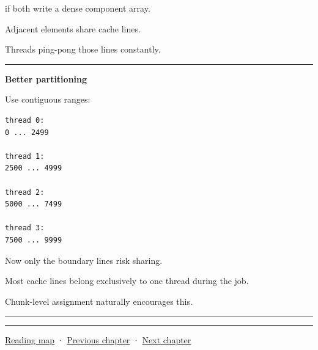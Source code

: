 if both write a dense component array.

Adjacent elements share cache lines.

Threads ping-pong those lines constantly.

\begin{center}\rule{0.5\linewidth}{0.5pt}\end{center}

\textbf{Better partitioning}

Use contiguous ranges:

\begin{verbatim}
thread 0:
0 ... 2499

thread 1:
2500 ... 4999

thread 2:
5000 ... 7499

thread 3:
7500 ... 9999
\end{verbatim}

Now only the boundary lines risk sharing.

Most cache lines belong exclusively to one thread during the job.

Chunk-level assignment naturally encourages this.

\begin{center}\rule{0.5\linewidth}{0.5pt}\end{center}

\begin{center}\rule{0.5\linewidth}{0.5pt}\end{center}

\href{Chapter\%20Edition/03\%20-\%20Game\%20Engine/00\%20-\%20Reading\%20Map}{Reading map} · \hyperref[05-engine-i-ch015]{Previous chapter} · \hyperref[05-engine-i-ch017]{Next chapter}
